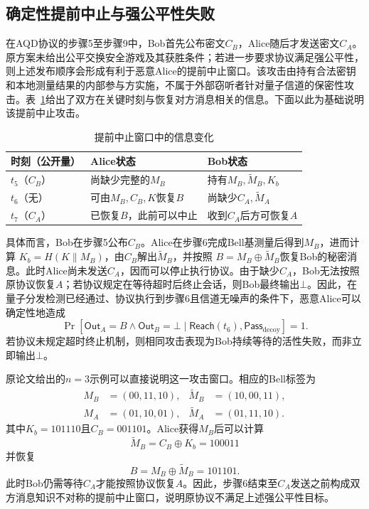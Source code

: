 \documentclass[UTF8,10pt,a4paper]{ctexart}
\theoremstyle{aqdplain}
\newcommand{\Prb}{\Pr}
\newcommand{\concat}{\mathbin{\|}}
\newcommand{\abort}{\bot}
\begin{document}
\subsection{确定性提前中止与强公平性失败}

在AQD协议的步骤5至步骤9中，Bob首先公布密文$C_B$，Alice随后才发送密文$C_A$\citep{zhang2025aqd}。原方案未给出公平交换安全游戏及其获胜条件；若进一步要求协议满足强公平性，则上述发布顺序会形成有利于恶意Alice的提前中止窗口。该攻击由持有合法密钥和本地测量结果的内部参与方实施，不属于外部窃听者针对量子信道的保密性攻击。表~\ref{tab:knowledge-evolution}给出了双方在关键时刻与恢复对方消息相关的信息。下面以此为基础说明该提前中止攻击。

\begin{table}[t]
\centering
\caption{提前中止窗口中的信息变化}
\label{tab:knowledge-evolution}
\footnotesize
\setlength{\tabcolsep}{3.5pt}
\renewcommand{\arraystretch}{1.25}
\begin{tabularx}{\columnwidth}{
  @{}
  >{\centering\arraybackslash}p{1.35cm}
  >{\raggedright\arraybackslash}X
  >{\raggedright\arraybackslash}X
  @{}
}
\toprule
时刻（公开量） & Alice状态 & Bob状态 \\
\midrule
$t_5$（$C_B$）
& 尚缺少完整的$M_B$
& 持有$M_B,\widetilde M_B,K_b$ \\

$t_6$（无）
& 可由$M_B,C_B,K$恢复$B$
& 尚缺少$C_A,\widetilde M_A$ \\

$t_7$（$C_A$）
& 已恢复$B$，此前可以中止
& 收到$C_A$后方可恢复$A$ \\
\bottomrule
\end{tabularx}
\end{table}

具体而言，Bob在步骤5公布$C_B$。Alice在步骤6完成Bell基测量后得到$M_B$，进而计算
$K_b=H(K\concat M_B)$，由$C_B$解出$\widetilde M_B$，并按照
$B=M_B\oplus\widetilde M_B$恢复Bob的秘密消息。此时Alice尚未发送$C_A$，因而可以停止执行协议。由于缺少$C_A$，Bob无法按照原协议恢复$A$；若协议规定在等待超时后终止会话，则Bob最终输出$\abort$。因此，在量子分发检测已经通过、协议执行到步骤6且信道无噪声的条件下，恶意Alice可以确定性地造成
\begin{equation}
\Prb\!\left[
\mathsf{Out}_A=B\wedge\mathsf{Out}_B=\abort
\mid \mathsf{Reach}(t_6),\mathsf{Pass}_{\mathrm{decoy}}
\right]=1.
\label{eq:unfair}
\end{equation}
若协议未规定超时终止机制，则相同攻击表现为Bob持续等待的活性失败，而非立即输出$\abort$。

原论文给出的$n=3$示例可以直接说明这一攻击窗口。相应的Bell标签为
\begin{align}
M_B&=(00,11,10),&
\widetilde M_B&=(10,00,11),\nonumber\\
M_A&=(01,10,01),&
\widetilde M_A&=(01,11,10).
\label{eq:source-example}
\end{align}
其中$K_b=101110$且$C_B=001101$。Alice获得$M_B$后可以计算
\[
\widetilde M_B=C_B\oplus K_b=100011
\]
并恢复
\[
B=M_B\oplus\widetilde M_B=101101.
\]
此时Bob仍需等待$C_A$才能按照协议恢复$A$。因此，步骤6结束至$C_A$发送之前构成双方消息知识不对称的提前中止窗口，说明原协议不满足上述强公平性目标。
\end{document}
